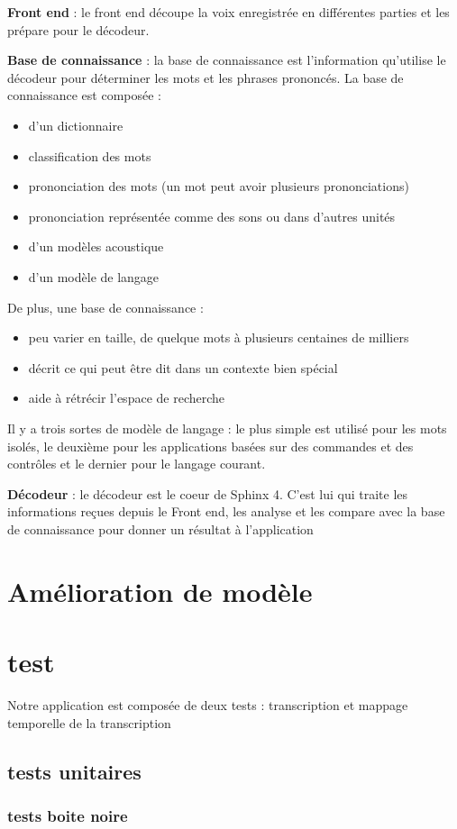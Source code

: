 \begin{description}
	\item{\textbf{Front end}} : le front end découpe la voix enregistrée en différentes parties et les prépare pour le décodeur.
	\item{\textbf{Base de connaissance}} : la base de connaissance est l’information qu’utilise le décodeur pour déterminer les mots et les phrases prononcés. La base de connaissance est composée :
	
	\begin{itemize}
		\item d’un dictionnaire
		\item classification des mots
		\item prononciation des mots (un mot peut avoir plusieurs prononciations)
		\item prononciation représentée comme des sons ou dans d’autres unités
		\item d’un modèles acoustique
		\item d’un modèle de langage
	\end{itemize}
	De plus, une base de connaissance :
	\begin{itemize}
		\item peu varier en taille, de quelque mots à plusieurs centaines de milliers
		\item décrit ce qui peut être dit dans un contexte bien spécial
		\item aide à rétrécir l’espace de recherche
	\end{itemize}
		
Il y a trois sortes de modèle de langage : le plus simple est utilisé pour les mots isolés, le deuxième pour les applications basées sur des commandes et des contrôles et le dernier pour le langage courant.
	
	\item{\textbf{Décodeur}} : le décodeur est le coeur de Sphinx 4. C’est lui qui traite les informations reçues depuis le Front end, les analyse et les compare avec la base de connaissance pour donner un résultat à l’application
	
	
	
\end{description}

	
	\chapter{Amélioration de modèle}
	
	
	\chapter{test}
	Notre application est composée de deux tests  :  transcription et mappage temporelle de la transcription

	\section{tests unitaires}

	\subsection{tests boite noire}
	
	
	
	
	
	

